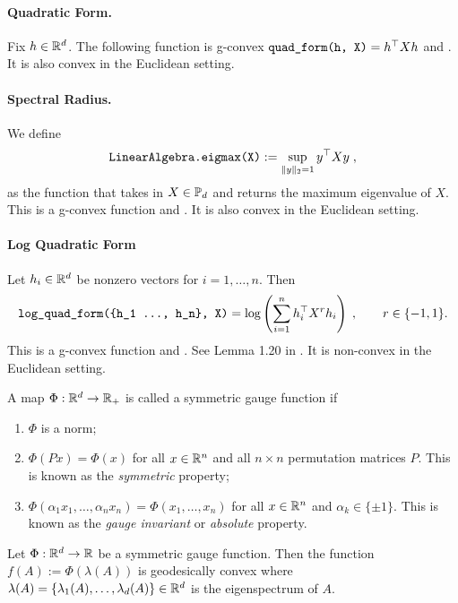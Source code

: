 \documentclass[twoside,11pt]{article}
\begin{document}
\paragraph{Quadratic Form.}
Fix $h \in \mathbb{R}^d$. The following function is g-convex $\texttt{quad\_form(h, X)} = h^\top X h$ and . It is also convex in the Euclidean setting. 


\paragraph{Spectral Radius.} We define
\[\texttt{LinearAlgebra.eigmax(X)} := \sup_{\|y\|_2 = 1}y^\top X y  \; ,\]
as the function that takes in $X \in \mathbb{P}_d$ and returns the maximum eigenvalue of $X$. This is a g-convex function and . It is also convex in the Euclidean setting.


\paragraph{Log Quadratic Form}

 Let $h_i \in \mathbb{R}^d$ be nonzero vectors for $i = 1, \ldots, n$. Then  
\[
\texttt{log\_quad\_form(\{h\_1 \ldots, h\_n\}, X)} = \log \left(\sum_{i=1}^n h_i^\top X^{r} h_i \right) \; , \qquad r \in \{-1, 1\}.
\]
This is a g-convex function and . See Lemma 1.20 in \citep{wieselstructuredcovariance}. It is non-convex in the Euclidean setting.


\begin{definition} 
     A map $\Phi:\mathbb{R}^d \to \mathbb{R}_+$ is called a symmetric gauge function if 
    \begin{enumerate}
        \item $\Phi$ is a norm;
        \item $\Phi(Px) = \Phi(x)$ for all $x \in \mathbb{R}^n$ and all $n\times n$ permutation matrices $P$. This is known as the \textit{symmetric} property;
        \item $\Phi(\alpha_1 x_1, \ldots, \alpha_n x_n) = \Phi(x_1, \ldots, x_n)$ for all $x \in \mathbb{R}^n$ and $\alpha_k \in \{\pm 1\}$. This is known as the \textit{gauge invariant} or \textit{absolute} property.
    \end{enumerate}
\end{definition}

\begin{prop}\label{prop:sgf_gvx}
 Let $\Phi: \mathbb{R}^d \to \mathbb{R}$ be a symmetric gauge function. Then the function  $f(A) := \Phi(\lambda(A))$ is geodesically convex where $\lambda(A) = \{\lambda_1(A), \ldots, \lambda_d(A)\} \in \mathbb{R}^d$ is the eigenspectrum of $A$.
\end{prop}
\end{document}
